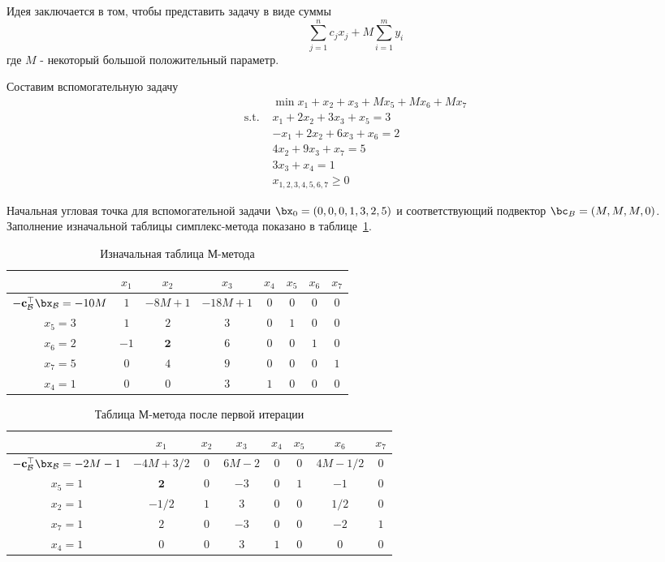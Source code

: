 \documentclass[12pt]{article}
\begin{document}
Идея заключается в том, чтобы представить задачу в виде суммы
$$
\sum_{j=1}^{n} c_j x_j + M \sum_{i=1}^m y_i
$$
где $M$ - некоторый большой положительный параметр.

 
\textbf{} Составим вспомогательную задачу
\begin{equation*}
\begin{split}
& \min x_1 + x_2 + x_3 + Mx_5 + Mx_6 + Mx_7\\
\text{s.t. } & x_1 + 2x_2 + 3x_3 + x_5= 3\\
& -x_1 + 2x_2 + 6x_3 + x_6 = 2\\
& 4x_2 + 9x_3 + x_7 = 5\\
& 3x_3 + x_4 = 1\\
& x_{1,2,3,4,5,6,7} \geq 0
\end{split}
\end{equation*}

Начальная угловая точка для вспомогательной задачи  $\bx_0 = (0,0,0,1, 3, 2, 5)$ и соответствующий подвектор $\bc_{B} = (M,M,M,0)$.
Заполнение изначальной таблицы симплекс-метода показано в таблице~\ref{tab::simplex_34}.

\begin{table}[!ht]
\centering
\caption{Изначальная таблица $М$-метода}
\begin{tabular}{|c|ccccccc|}
\hline
& $x_1$ & $x_2$ & $x_3$ & $x_4$ & $x_5$ & $x_6$ & $x_7$ &\\
\hline
$-\mathbf{c}_{\mathcal{B}}^{\top}\bx_{\mathcal{B}} = -10M$ & $1$ & $-8M + 1$ & $-18M +1$  & $0$ & $0$ & $0$ & $0$ \\
\hline
$x_5 = 3$ & $1$ & $2$ & $3$ & $0$ & $1$ & $0$ & $0$  \\
$x_6 = 2$ & $-1$ & $\mathbf{2}$ & $6$ & $0$ & $0$ & $1$ & $0$ \\
$x_7 = 5$ & $0$ & $4$ & $9$ & $0$ & $0$ & $0$ & $1$  \\
$x_4 = 1$ & $0$ & $0$ & $3$ & $1$ & $0$ & $0$ & $0$  \\
\hline
\end{tabular}
\label{tab::simplex_34}
\end{table}

\begin{table}[!ht]
\centering
\caption{Таблица $М$-метода после первой итерации}
\begin{tabular}{|c|ccccccc|}
\hline
& $x_1$ & $x_2$ & $x_3$ & $x_4$ & $x_5$ & $x_6$ & $x_7$ \\
\hline
$-\mathbf{c}_{\mathcal{B}}^{\top}\bx_{\mathcal{B}} = -2M - 1$ & $-4M +3/2$ & $0$ & $6M-2$ & $0$ & $0$ & $4M-1/2$ & $0$\\
\hline
$x_5 = 1$ & $\mathbf{2}$ & $0$ & $-3$ & $0$ & $1$ & $-1$ & $0$\\
$x_2 = 1$ & $-1/2$ & $1$ & $3$ & $0$ & $0$ & $1/2$ & $0$ \\
$x_7 = 1$ & $2$ & $0$ & $-3$ & $0$ & $0$ & $-2$ & $1$ \\
$x_4 = 1$ & $0$ & $0$ & $3$ & $1$ & $0$ & $0$ & $0$ \\
\hline
\end{tabular}
\label{tab::simplex_35}
\end{table}
\end{document}
